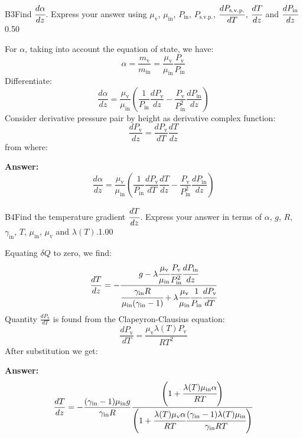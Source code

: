 \documentclass[11pt,a4paper]{article}
\begin{document}
\begin{solcard}{B3}{Find $\cfrac{d\alpha}{dz}$. Express your answer using $\mu_\text{v}$, $\mu_\text{in}$, $P_\text{in}$, $P_\text{s.v.p.}$, $\cfrac{dP_\text{s.v.p.}}{dT}$, $\cfrac{dT}{dz}$ and $\cfrac{dP_\text{in}}{dz}$}{0.50}

For $\alpha$, taking into account the equation of state, we have: $$\alpha=\frac{m_\text{v}}{m_\text{in}}=\frac{\mu_\text{v}}{\mu_\text{in}}\frac{P_\text{v}}{P_\text{in}} $$ Differentiate: $$\frac{d\alpha}{dz}=\frac{\mu_\text{v}}{\mu_\text{in}}\left(\frac{1}{P_\text{in}}\frac{dP_\text{v}}{dz}-\frac{P_\text{v}}{P^2_\text{in}}\frac{dP_\text{in}}{dz}\right) $$ Consider derivative pressure pair by height as derivative complex function: $$\frac{dP_\text{v}}{dz}=\frac{dP_\text{v}}{dT}\frac{dT}{dz} $$ from where:

\par\smallskip\noindent\textbf{Answer:} $$\frac{d\alpha}{dz}=\frac{\mu_\text{v}}{\mu_\text{in}}\left(\frac{1}{P_\text{in}}\frac{dP_\text{v}}{dT}\frac{dT}{dz}-\frac{P_\text{v}}{P^2_\text{in}}\frac{dP_\text{in}}{dz}\right) $$
\end{solcard}

\begin{solcard}{B4}{Find the temperature gradient $\cfrac{dT}{dz}$. Express your answer in terms of $\alpha$, $g$, $R$, $\gamma_\text{in}$, $T$, $\mu_\text{in}$, $\mu_\text{v}$ and $\lambda(T)$.}{1.00}

Equating $\delta{Q}$ to zero, we find: $$\frac{dT}{dz}=-\cfrac{g-\lambda \cfrac{\mu_\text{v}}{\mu_\text{in}}\cfrac{P_\text{v}}{P^2_\text{in}}\cfrac{dP_\text{in}}{dz}}{\cfrac{\gamma_\text{in}R}{\mu_\text{in}(\gamma_\text{in}-1)}+\lambda \cfrac{\mu_\text{v}}{\mu_\text{in}}\cfrac{1}{P_\text{in}}\cfrac{dP_\text{v}}{dT}} $$ Quantity $\frac{dP_\text{v}}{dT}$ is found from the Clapeyron-Clausius equation: $$\frac{dP_\text{v}}{dT}=\frac{\mu_\text{v}\lambda(T)P_\text{v}}{RT^2} $$ After substitution we get:

\par\smallskip\noindent\textbf{Answer:} $$\frac{dT}{dz}=-\frac{(\gamma_\text{in}-1)\mu_\text{in}g}{\gamma_\text{in} R}\frac{\left(1+\cfrac{\lambda(T)\mu_\text{in}\alpha}{RT}\right)}{\left(1+\cfrac{\lambda(T)\mu_\text{v}\alpha}{RT}\cfrac{(\gamma_\text{in}-1)\lambda(T)\mu_\text{in}}{\gamma_\text{in}RT}\right)} $$
\end{solcard}
\end{document}

